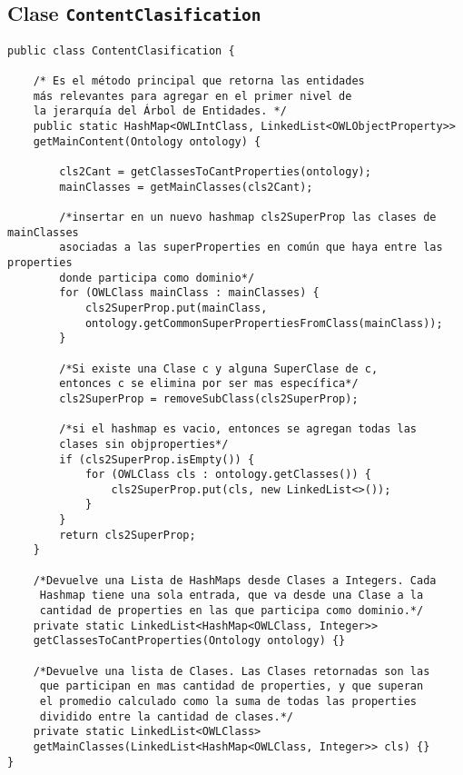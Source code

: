 \subsection{Clase \texttt{ContentClasification}}
\label{sec:clase_content_clasif}

\begin{verbatim}
public class ContentClasification {

    /* Es el método principal que retorna las entidades
    más relevantes para agregar en el primer nivel de
    la jerarquía del Árbol de Entidades. */
    public static HashMap<OWLIntClass, LinkedList<OWLObjectProperty>>
    getMainContent(Ontology ontology) {
        
        cls2Cant = getClassesToCantProperties(ontology);
        mainClasses = getMainClasses(cls2Cant);

        /*insertar en un nuevo hashmap cls2SuperProp las clases de mainClasses
        asociadas a las superProperties en común que haya entre las properties 
        donde participa como dominio*/
        for (OWLClass mainClass : mainClasses) {
            cls2SuperProp.put(mainClass,
            ontology.getCommonSuperPropertiesFromClass(mainClass));
        }
        
        /*Si existe una Clase c y alguna SuperClase de c, 
        entonces c se elimina por ser mas específica*/
        cls2SuperProp = removeSubClass(cls2SuperProp);

        /*si el hashmap es vacio, entonces se agregan todas las
        clases sin objproperties*/
        if (cls2SuperProp.isEmpty()) {
            for (OWLClass cls : ontology.getClasses()) {
                cls2SuperProp.put(cls, new LinkedList<>());
            }
        }
        return cls2SuperProp;
    }
    
    /*Devuelve una Lista de HashMaps desde Clases a Integers. Cada
     Hashmap tiene una sola entrada, que va desde una Clase a la
     cantidad de properties en las que participa como dominio.*/
    private static LinkedList<HashMap<OWLClass, Integer>>
    getClassesToCantProperties(Ontology ontology) {}
    
    /*Devuelve una lista de Clases. Las Clases retornadas son las
     que participan en mas cantidad de properties, y que superan 
     el promedio calculado como la suma de todas las properties
     dividido entre la cantidad de clases.*/
    private static LinkedList<OWLClass>
    getMainClasses(LinkedList<HashMap<OWLClass, Integer>> cls) {}
}

\end{verbatim}


